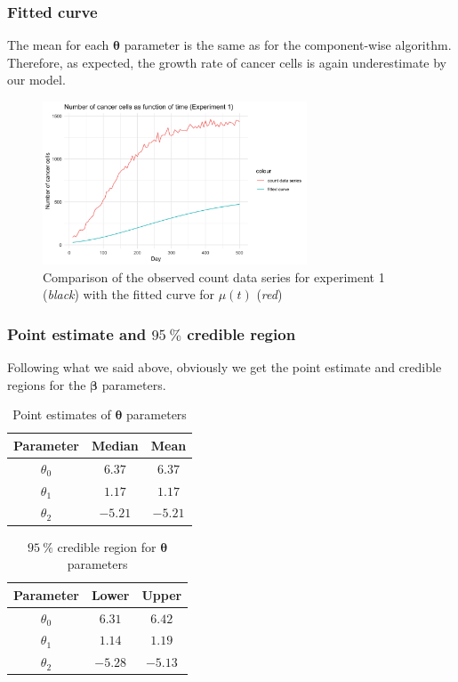 \subsubsection*{Fitted curve}

The mean for each $\bm{\theta}$ parameter is the same as for the component-wise algorithm. Therefore, as expected, the growth rate of cancer cells is again underestimate by our model.

\begin{figure}[H]
	\centering
	\includegraphics[width=0.7\textwidth]{figures/metropolis_vw/metropolis_vw_fitted_curve.png}
	\caption{Comparison of the observed count data series for experiment 1 (\textit{black}) with the fitted curve for $\mu(t)$ (\textit{red})}
	\label{fig:metropolis-vw-fitted-curve}
\end{figure}

\subsubsection*{Point estimate and $\SI{95}{\percent}$ credible region}

Following what we said above, obviously we get the point estimate and credible regions for the $\bm{\beta}$ parameters.

\begin{table}[H]
	\centering\begin{tabular}{|c|c|c|} \hline 
		Parameter & Median & Mean \\ \hline 
		$\theta_0$ & $6.37$ & $6.37$ \\ 
		$\theta_1$ & $1.17$ & $1.17$ \\
		$\theta_2$ & $-5.21$ & $-5.21$ \\ \hline
	\end{tabular}
	\caption{Point estimates of $\bm{\theta}$ parameters}
	\label{tab:metropolis-cw-point-estimates}
\end{table}

\begin{table}[H]
	\centering\begin{tabular}{|c|c|c|} \hline 
		Parameter & Lower & Upper \\ \hline 
		$\theta_0$ & $6.31$ & $6.42$ \\ 
		$\theta_1$ & $1.14$ & $1.19$ \\
		$\theta_2$ & $-5.28$ & $-5.13$ \\ \hline
	\end{tabular}
	\caption{$\SI{95}{\percent}$ credible region for $\bm{\theta}$ parameters}
	\label{tab:metropolis-cw-credible-region}
\end{table}